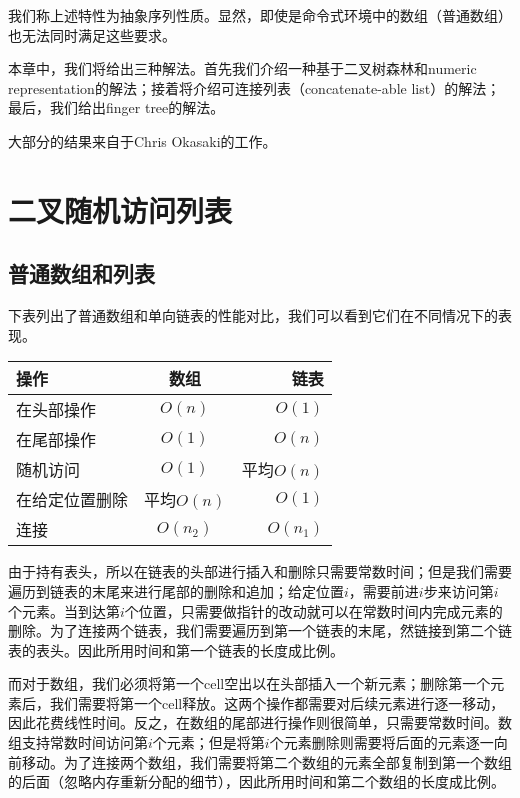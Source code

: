 \documentclass[UTF8]{article}
\begin{document}
我们称上述特性为抽象序列性质。显然，即使是命令式环境中的数组（普通数组）也无法同时满足这些要求。

本章中，我们将给出三种解法。首先我们介绍一种基于二叉树森林和numeric representation的解法；接着将介绍可连接列表（concatenate-able list）的解法；最后，我们给出finger tree的解法。

大部分的结果来自于Chris Okasaki的工作\cite{okasaki-book}。

\section{二叉随机访问列表}

\subsection{普通数组和列表}

下表列出了普通数组和单向链表的性能对比，我们可以看到它们在不同情况下的表现。

\begin{tabular}{l | c | r}
  \hline
  操作 & 数组 & 链表 \\
  \hline
  在头部操作 & $O(n)$ & $O(1)$ \\
  在尾部操作 & $O(1)$ & $O(n)$ \\
  随机访问 & $O(1)$ & 平均$O(n)$ \\
  在给定位置删除 & 平均$O(n)$ & $O(1)$ \\
  连接 & $O(n_2)$ & $O(n_1)$ \\
  \hline
\end{tabular}

由于持有表头，所以在链表的头部进行插入和删除只需要常数时间；但是我们需要遍历到链表的末尾来进行尾部的删除和追加；给定位置$i$，需要前进$i$步来访问第$i$个元素。当到达第$i$个位置，只需要做指针的改动就可以在常数时间内完成元素的删除。为了连接两个链表，我们需要遍历到第一个链表的末尾，然链接到第二个链表的表头。因此所用时间和第一个链表的长度成比例。

而对于数组，我们必须将第一个cell空出以在头部插入一个新元素；删除第一个元素后，我们需要将第一个cell释放。这两个操作都需要对后续元素进行逐一移动，因此花费线性时间。反之，在数组的尾部进行操作则很简单，只需要常数时间。数组支持常数时间访问第$i$个元素；但是将第$i$个元素删除则需要将后面的元素逐一向前移动。为了连接两个数组，我们需要将第二个数组的元素全部复制到第一个数组的后面（忽略内存重新分配的细节），因此所用时间和第二个数组的长度成比例。
\end{document}
